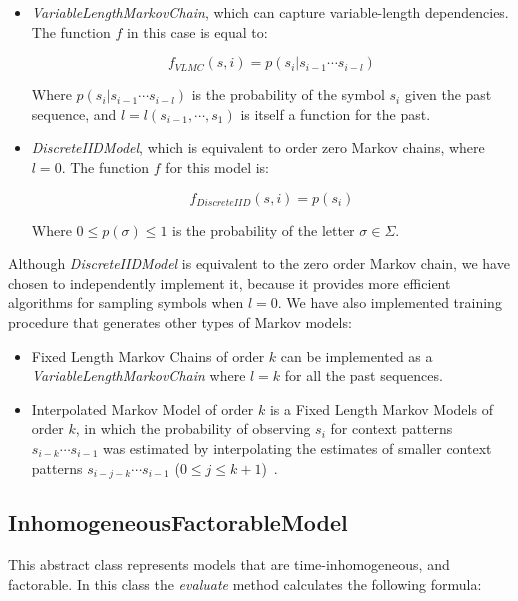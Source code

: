  \begin{itemize}
\item \textit{VariableLengthMarkovChain}, which can capture variable-length dependencies. The function $f$ in this case is equal to:

\[ f_{VLMC}(s, i) = p(s_i|s_{i-1}\cdots s_{i-l})  \]

Where $p(s_i|s_{i-1}\cdots s_{i-l})$ is the probability of the symbol $s_i$ given the past sequence, and $l = l(s_{i-1}, \cdots, s_1)$ is itself a function for the past.

 \item \textit{DiscreteIIDModel}, which is equivalent to order zero Markov chains, where $l = 0$. The function $f$ for this model is:

\[ f_{DiscreteIID}(s,i) = p(s_i) \]

Where $0 \leq p(\sigma) \leq 1$ is the probability of the letter $\sigma \in \Sigma$.

\end{itemize}

Although  \textit{DiscreteIIDModel} is equivalent to the zero order Markov chain, we have chosen to independently implement it, because it provides more efficient algorithms for sampling symbols when $l=0$. We have also implemented training procedure that generates other types of Markov models:

\begin{itemize}
\item Fixed Length Markov Chains of order $k$ can be implemented as a \textit{VariableLengthMarkovChain} where $l=k$ for all the past sequences.

\item Interpolated Markov Model of order $k$ is a Fixed Length Markov Models of order $k$, in which the probability of observing $s_i$ for  context patterns $s_{i-k} \cdots s_{i-1}$ was estimated by interpolating the estimates of smaller context patterns $s_{i-j-k} \cdots s_{i-1}$ ($0\leq j \leq k+1$)~\cite{Salzberg1998}.

\end{itemize}



\subsection{InhomogeneousFactorableModel}
\label{sec:inhomogeneous}

This abstract class rep\-re\-sents models that are time-inhomogeneous, and factorable. In this class the \textit{evaluate} method calculates the following formula:

